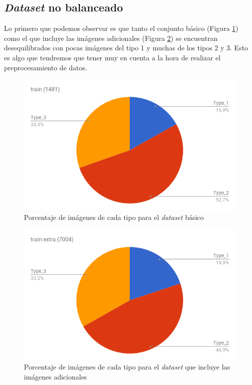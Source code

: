 \subsection{\textit{Dataset} no balanceado}

Lo primero que podemos observar es que tanto el conjunto básico (Figura \ref{fig:num-images-train-dataset}) como el que incluye las imágenes adicionales (Figura \ref{fig:num-images-train-extra-dataset}) se encuentran desequilibrados con pocas imágenes del tipo 1 y muchas de los tipos 2 y 3. Esto es algo que tendremos que tener muy en cuenta a la hora de realizar el preprocesamiento de datos.

\begin{figure}[H]
	\centering
	\includegraphics[width=12cm]{img/num-images-train-dataset}
	\caption{Porcentaje de imágenes de cada tipo para el \textit{dataset} básico}
	\label{fig:num-images-train-dataset}
\end{figure}

\begin{figure}[H]
	\centering
	\includegraphics[width=12cm]{img/num-images-train-extra-dataset}
	\caption{Porcentaje de imágenes de cada tipo para el \textit{dataset} que incluye las imágenes adicionales}
	\label{fig:num-images-train-extra-dataset}
\end{figure}

